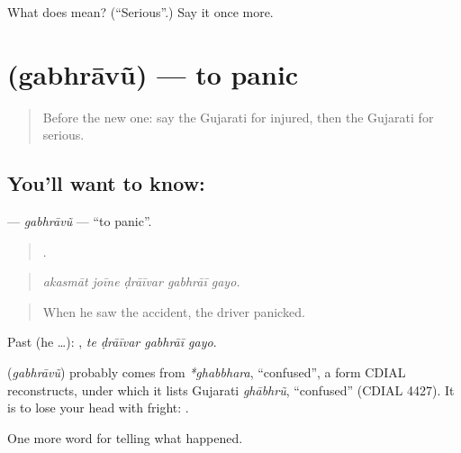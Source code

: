 \begin{tcolorbox}[breakable,colback=teal!4,colframe=teal!35!black,title={Before you move on}]
What does  mean? (\textquotedblleft{}Serious\textquotedblright{}.) Say it once more.
\end{tcolorbox}
\section[\texorpdfstring{\gu{ગભરાવું} (gabhrāvũ)}{ગભરાવું (gabhrāvũ)}]{ (gabhrāvũ) — to panic}

\label{lesson:GU-C293-gabhravu}



\begin{quote}
Before the new one: say the Gujarati for injured, then the Gujarati for serious.
\end{quote}

\subsection*{You'll want to know: }
\textbf{} — \emph{gabhrāvũ} — \textquotedblleft{}to panic\textquotedblright{}.

\begin{quote}
    .
\end{quote}

\begin{quote}
\emph{akasmāt joīne ḍrāīvar gabhrāī gayo.}
\end{quote}

\begin{quote}
When he saw the accident, the driver panicked.
\end{quote}

Past (he …):    , \emph{te ḍrāīvar gabhrāī gayo}.

\begin{cousinweb}
\textbf{} (\emph{gabhrāvũ}) probably comes from \emph{*ghabbhara}, \textquotedblleft{}confused\textquotedblright{}, a form CDIAL reconstructs, under which it lists Gujarati \emph{ghābhrũ}, \textquotedblleft{}confused\textquotedblright{} (CDIAL 4427). It is to lose your head with fright: \textbf{ }.
\end{cousinweb}

\begin{grammarlens}[title={What you've built}]
One more word for telling what happened.
\end{grammarlens}

